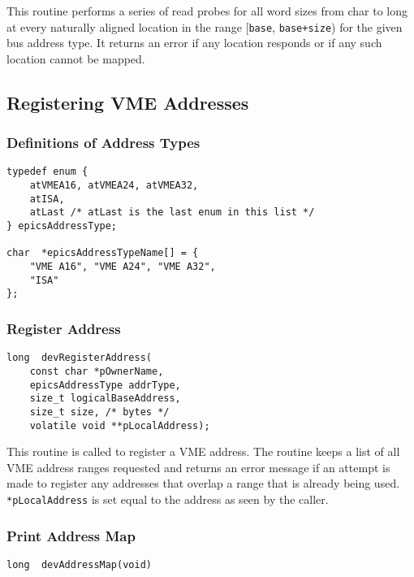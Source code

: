 This routine performs a series of read probes for all word sizes from char to long at every naturally aligned location in the 
range [\verb|base|, \verb|base+size|) for the given bus address type. It returns an error if any location responds or if any such 
location cannot be mapped.

\subsection{Registering VME Addresses}

\subsubsection{Definitions of Address Types}

\begin{verbatim}
typedef enum {
    atVMEA16, atVMEA24, atVMEA32,
    atISA,
    atLast /* atLast is the last enum in this list */
} epicsAddressType;

char  *epicsAddressTypeName[] = {
    "VME A16", "VME A24", "VME A32",
    "ISA"
};
\end{verbatim}

\subsubsection{Register Address}

\begin{verbatim}
long  devRegisterAddress(
    const char *pOwnerName,
    epicsAddressType addrType,
    size_t logicalBaseAddress,
    size_t size, /* bytes */
    volatile void **pLocalAddress);
\end{verbatim}

This routine is called to register a VME address. The routine keeps a list of all VME address ranges requested and returns 
an error message if an attempt is made to register any addresses that overlap a range that is already being used. 
\verb|*pLocalAddress| is set equal to the address as seen by the caller.

\subsubsection{Print Address Map}

\begin{verbatim}
long  devAddressMap(void)
\end{verbatim}

